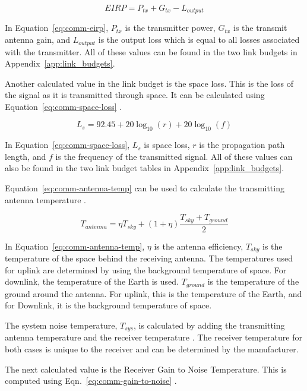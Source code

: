 \documentclass[12pt]{article}
\begin{document}
\begin{equation}\label{eq:comm-eirp}
EIRP = P_{tx} + G_{tx} - L_{output} 
\end{equation}

In Equation~\ref{eq:comm-eirp}, $P_{tx}$ is the transmitter power, $G_{tx}$ is the transmit antenna gain, and $L_{output}$ is the output loss which is equal to all losses associated with the transmitter. All of these values can be found in the two link budgets in Appendix~\ref{app:link_budgets}.

Another calculated value in the link budget is the space loss. This is the loss of the signal as it is transmitted through space. It can be calculated using Equation~\ref{eq:comm-space-loss} \cite[p.~476]{SMAD}.

\begin{equation}\label{eq:comm-space-loss}
L_s = 92.45 + 20\log_{10}(r) + 20\log_{10}(f) 
\end{equation}

In Equation~\ref{eq:comm-space-loss}, $L_s$ is space loss, $r$ is the propagation path length, and $f$ is the frequency of the transmitted signal. All of these values can also be found in the two link budget tables in Appendix~\ref{app:link_budgets}.

Equation~\ref{eq:comm-antenna-temp} can be used to calculate the transmitting antenna temperature \cite{pozar}.

\begin{equation}\label{eq:comm-antenna-temp}
T_{antenna} = \eta T_{sky} + (1 + \eta) \frac{T_{sky} + T_{ground}}{2} 
\end{equation}

In Equation~\ref{eq:comm-antenna-temp}, $\eta$ is the antenna efficiency, $T_{sky}$ is the temperature of the space behind the receiving antenna. The temperatures used for uplink are determined by using the background temperature of space. For downlink, the temperature of the Earth is used. $T_{ground}$ is the temperature of the ground around the antenna. For uplink, this is the temperature of the Earth, and for Downlink, it is the background temperature of space.

The system noise temperature, $T_{sys}$, is calculated by adding the transmitting antenna temperature and the receiver temperature \cite{pozar}. The receiver temperature for both cases is unique to the receiver and can be determined by the manufacturer.

The next calculated value is the Receiver Gain to Noise Temperature. This is computed using Eqn.~\ref{eq:comm-gain-to-noise} \cite[p.~477]{SMAD}.
\end{document}
